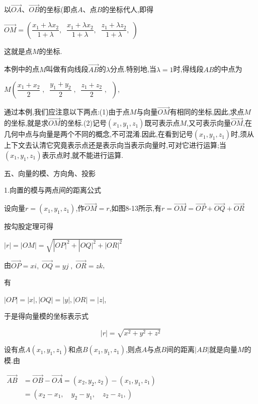 \documentclass[oneside]{book}
\begin{document}
以$\overrightarrow {OA} $、$\overrightarrow {OB} $的坐标(即点$A$、点$B$的坐标代人,即得

$\overrightarrow {OM}  = (\dfrac{{{x_1} + \lambda {x_2}}}{{1 + \lambda }},\;\;\dfrac{{{x_1} + \lambda {x_2}}}{{1 + \lambda }},\;\;\dfrac{{{z_1} + \lambda {z_2}}}{{1 + \lambda }},\;)$

这就是点$M$的坐标.

本例中的点$M$叫做有向线段$\overrightarrow {AB} $的$\lambda $分点.特别地,当$\lambda  = 1$时,得线段$AB$的中点为

$M(\dfrac{{{x_1} + {x_2}}}{2}\;,\;\;\dfrac{{{y_1} + {y_2}}}{2}\;,\;\;\dfrac{{{z_1} + {z_2}}}{2}\;,\;\;)$,

通过本例,我们应注意以下两点:(1)由于点$M$与向量$\overrightarrow {OM} $有相同的坐标,因此,求点$M$的坐标,就是求$\overrightarrow {OM} $的坐标.(2)记号$\left( {{x_1},{y_1},{z_1}} \right)$既可表示点$M$,又可表示向量$\overrightarrow {OM} $,在几何中点与向量是两个不同的概念,不可混淆.因此,在看到记号$\left( {{x_1},{y_1},{z_1}} \right)$时,须从上下文去认清它究竟表示点还是表示向当表示向量时,可对它进行运算;当$\left( {{x_1},{y_1},{z_1}} \right)$表示点时,就不能进行运算.

五、向量的模、方向角、投影

1.向置的模与两点间的距离公式

设向量$r=\left( {{x_1},{y_1},{z_1}} \right)$,作$\overrightarrow {OM} =r$,如图8-13所示,有$r = \overrightarrow {OM}  = \overrightarrow {OP}  + \overrightarrow {OQ}  + \overrightarrow {OR} $

按勾股定理可得

$|r| = |OM| = \sqrt {|OP{|^2} + |OQ{|^2} + |OR{|^2}} $

由$\overrightarrow {OP}  = xi,\;\overrightarrow {OQ}  = yj\;,\;\overrightarrow {OR}  = zk$,

有

$\left| {OP} \right| = |x|,\left| {OQ} \right| = \left| y \right|,|OR| = |z|$,

于是得向量模的坐标表示式

$$|r| = \sqrt {{x^2} + {y^2} + {z^2}} $$

设有点$A\left( {{x_1},{y_1},{z_1}} \right)$和点$B\left( {{x_1},{y_1},{z_1}} \right)$,则点$A$与点$B$间的距离$|AB|$就是向量$M$的模.由

$\begin{aligned} \overrightarrow{A B} &=\overrightarrow{O B}-\overrightarrow{O A}=\left(x_{2}, y_{2}, z_{2}\right)-\left(x_{1}, y_{1}, z_{1}\right) \\ &=\left(x_{2}-x_{1}, \quad y_{2}-y_{1}, \quad z_{2}-z_{1},\right) \end{aligned}$
\end{document}
